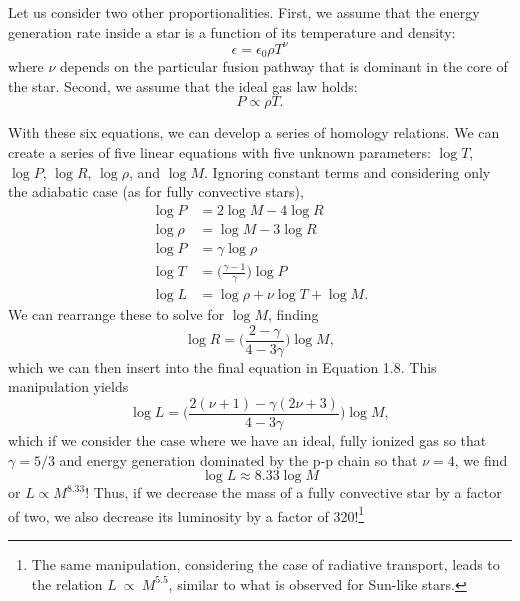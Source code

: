 \documentclass[12pt]{caltech_thesis}
\begin{document}
Let us consider two other proportionalities. First, we assume that the energy generation rate
inside a star is a function of its temperature and density:
\begin{equation}
\epsilon = \epsilon_0 \rho T^\nu
\end{equation}
where $\nu$ depends on the particular fusion pathway that is dominant in the core of
the star.
Second, we assume that the ideal gas law holds:
\begin{equation}
P \propto \rho T.
\end{equation}

With these six equations, we can develop a series of homology relations. We can create
a series of five linear equations with five unknown parameters: $\log T$, $\log P$, 
$\log R$, $\log \rho$, and $\log M$.
Ignoring constant terms and considering only the adiabatic case (as for fully 
convective stars),
\begin{align}
\log P &= 2 \log M - 4 \log R \nonumber \\
\log \rho &= \log M - 3 \log R \nonumber \\
\log P &= \gamma \log \rho \\
\log T &= \bigg(\frac{\gamma - 1}{\gamma}\bigg) \log P \nonumber \\
\log L &= \log \rho + \nu \log T + \log M \nonumber.
\end{align}
We can rearrange these to solve for $\log M$, finding
\begin{equation}
\log R = \bigg(\frac{2-\gamma}{4 - 3\gamma}\bigg) \log M,
\end{equation}
which we can then insert into the final equation in Equation 1.8.
This manipulation yields
\begin{equation}
\log L = \bigg(\frac{2(\nu + 1) - \gamma(2\nu + 3)}{4 - 3\gamma}\bigg) \log M,
\end{equation}
which if we consider the case where we have an ideal, fully ionized gas so that $\gamma = 5/3$ and energy generation dominated by the p-p chain so that $\nu = 4$, we find
\begin{equation}
\log L \approx 8.33 \log M
\end{equation}
or $L \propto M^{8.33}$! Thus, if we decrease the mass of a fully convective star by a factor of two, 
we also decrease its luminosity by a factor of 320!\footnote{The same manipulation,
considering the case of radiative transport, leads to the relation $L~\propto~M^{5.5}$,
similar to what is observed for Sun-like stars.} 
\end{document}
